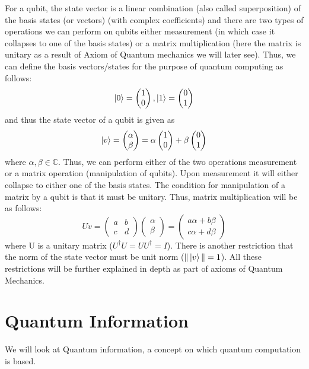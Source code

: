For a qubit, the state vector is a linear combination (also called superposition) of the basis states (or vectors) (with complex coefficients) and there are two types of operations we can perform on qubits either measurement (in which case it collapses to one of the basis states) or a matrix multiplication (here the matrix is unitary as a result of Axiom of Quantum mechanics we will later see). Thus, we can define the basis vectors/states for the purpose of quantum computing as follows:
\[
\ket{0}=\begin{pmatrix} 1 \\ 0 \end{pmatrix}, \ket{1}=\begin{pmatrix} 0 \\ 1 \end{pmatrix}
\]
and thus the state vector of a qubit is given as
\[
\ket{v}=\begin{pmatrix} \alpha \\ \beta \end{pmatrix} = \alpha \begin{pmatrix} 1 \\ 0 \end{pmatrix} + \beta \begin{pmatrix} 0 \\ 1 \end{pmatrix}
\]
where $\alpha,\beta \in \mathbb{C}$. Thus, we can perform either of the two operations measurement or a matrix operation (manipulation of qubits). Upon measurement it will either collapse to either one of the basis states. The condition for manipulation of a matrix by a qubit is that it must be unitary. Thus, matrix multiplication will be as follows:
\[
Uv=\begin{pmatrix} a & b \\ c & d \end{pmatrix}\begin{pmatrix} \alpha \\ \beta \end{pmatrix} =\begin{pmatrix} a \alpha + b\beta \\ c\alpha + d\beta \end{pmatrix}
\]
where U is a unitary matrix ($U^{\dagger}U=UU^{\dagger}=I$).
There is another restriction that the norm of the state vector must be unit norm ($\|\ket{v}\|=1$). All these restrictions will be further explained in depth as part of axioms of Quantum Mechanics.

\section{Quantum Information}
We will look at Quantum information, a concept on which quantum computation is based.

